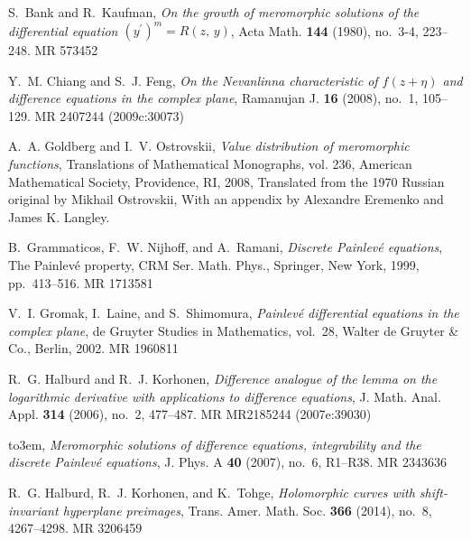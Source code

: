 \documentclass{amsart}
\begin{document}
\def\cprime{$'$}
\providecommand{\bysame}{\leavevmode\hbox to3em{\hrulefill}\thinspace}
\providecommand{\MR}{\relax\ifhmode\unskip\space\fi MR }
\providecommand{\MRhref}[2]{%
  \href{http://www.ams.org/mathscinet-getitem?mr=#1}{#2}
}
\providecommand{\href}[2]{#2}
\begin{thebibliography}{10}

S.~Bank and R.~Kaufman, \emph{On the growth of meromorphic solutions of the
  differential equation {$(y^{\prime} )^{m}=R(z,\,y)$}}, Acta Math.
  \textbf{144} (1980), no.~3-4, 223--248. \MR{573452}

Y.~M. Chiang and S.~J. Feng, \emph{On the {N}evanlinna characteristic of
  {$f(z+\eta)$} and difference equations in the complex plane}, Ramanujan J.
  \textbf{16} (2008), no.~1, 105--129. \MR{2407244 (2009c:30073)}

A.~A. Goldberg and I.~V. Ostrovskii, \emph{Value distribution of meromorphic
  functions}, Translations of Mathematical Monographs, vol. 236, American
  Mathematical Society, Providence, RI, 2008, Translated from the 1970 Russian
  original by Mikhail Ostrovskii, With an appendix by Alexandre Eremenko and
  James K. Langley.

B.~Grammaticos, F.~W. Nijhoff, and A.~Ramani, \emph{Discrete {P}ainlev\'e
  equations}, The {P}ainlev\'e property, CRM Ser. Math. Phys., Springer, New
  York, 1999, pp.~413--516. \MR{1713581}

V.~I. Gromak, I.~Laine, and S.~Shimomura, \emph{Painlev\'e differential
  equations in the complex plane}, de Gruyter Studies in Mathematics, vol.~28,
  Walter de Gruyter \& Co., Berlin, 2002. \MR{1960811}

R.~G. Halburd and R.~J. Korhonen, \emph{Difference analogue of the lemma on the
  logarithmic derivative with applications to difference equations}, J. Math.
  Anal. Appl. \textbf{314} (2006), no.~2, 477--487. \MR{MR2185244
  (2007e:39030)}

\bysame, \emph{Meromorphic solutions of difference equations, integrability and
  the discrete {P}ainlev\'e equations}, J. Phys. A \textbf{40} (2007), no.~6,
  R1--R38. \MR{2343636}

R.~G. Halburd, R.~J. Korhonen, and K.~Tohge, \emph{Holomorphic curves with
  shift-invariant hyperplane preimages}, Trans. Amer. Math. Soc. \textbf{366}
  (2014), no.~8, 4267--4298. \MR{3206459}


\end{thebibliography}
\end{document}
